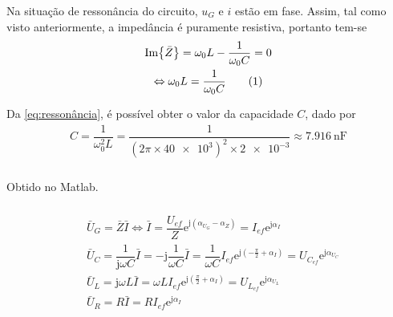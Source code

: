 \documentclass[a4paper, titlepage, portuguese]{article}
\newcommand{\eq}{\Leftrightarrow} %
\newcommand\numberthis{\addtocounter{equation}{1}\tag{\theequation}}
\begin{document}
	\subsubsection{}
		\par
		Na situação de ressonância do circuito, $u_G$ e $i$ estão em fase.  Assim, tal como visto anteriormente, a impedância é puramente resistiva, portanto tem-se
		\begin{gather*}
			\Im{\bar{Z}} = \omega_0 L - \dfrac{1}{\omega_0 C} = 0 \\
			\eq \omega_0 L = \dfrac{1}{\omega_0 C} \numberthis \label{eq:ressonância}
		\end{gather*}
		\par
		Da \autoref{eq:ressonância}, é possível obter o valor da capacidade $C$, dado por
		\begin{gather*}
			C = \dfrac{1}{\omega_0^2 L} = \dfrac{1}{\left(2\pi \times \num{40e3}\right)^2 \times \num{2e-3}} \approx \SI{7.916}{\nano\farad}
		\end{gather*}

	\subsubsection{}
		\par
		Obtido no Matlab.

	\subsubsection{}
		\begin{align*}
			&\bar{U}_G = \bar{Z} \bar{I} \eq \bar{I} = \dfrac{U_{ef}}{Z} \mathrm{e}^{\mathrm{j}\left(\alpha_{U_G} - \alpha_{Z}\right)} = I_{ef} \mathrm{e}^{\mathrm{j} \alpha_I} \\
			&\bar{U}_C = \dfrac{1}{\mathrm{j}\omega C} \bar{I} = -\mathrm{j} \dfrac{1}{\omega C} \bar{I} = \dfrac{1}{\omega C}I_{ef} \mathrm{e}^{\mathrm{j} \left(-\frac{\pi}{2}+\alpha_I\right)} = U_{C_{ef}} \mathrm{e}^{\mathrm{j} \alpha_{U_C}} \\
			&\bar{U}_L = \mathrm{j}\omega L \bar{I} = \omega LI_{ef} \mathrm{e}^{\mathrm{j} \left(\frac{\pi}{2}+\alpha_I\right)} = U_{L_{ef}} \mathrm{e}^{\mathrm{j} \alpha_{U_L}} \\
			&\bar{U}_R = R \bar{I} = R I_{ef} \mathrm{e}^{\mathrm{j} \alpha_I}
		\end{align*}
\end{document}

